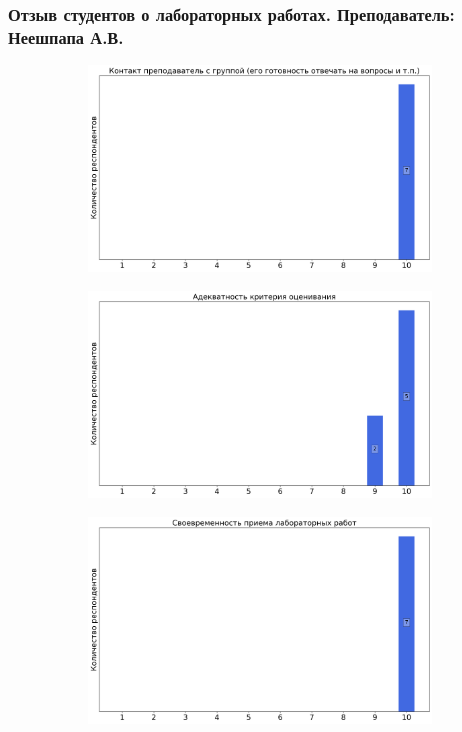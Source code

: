     \subsubsection{Отзыв студентов о лабораторных работах. Преподаватель: Неешпапа А.В.}
		\begin{figure}[H]
			\centering
			\begin{subfigure}[b]{0.45\textwidth}
				\centering
				\includegraphics[width=\textwidth]{images/3 course/Аналоговая электроника/labniks-marks-Неешпапа А.В.-0.png}
			\end{subfigure}
			\begin{subfigure}[b]{0.45\textwidth}
				\centering
				\includegraphics[width=\textwidth]{images/3 course/Аналоговая электроника/labniks-marks-Неешпапа А.В.-1.png}
			\end{subfigure}
			\begin{subfigure}[b]{0.45\textwidth}
				\centering
				\includegraphics[width=\textwidth]{images/3 course/Аналоговая электроника/labniks-marks-Неешпапа А.В.-2.png}

\end{subfigure}
\end{figure}
